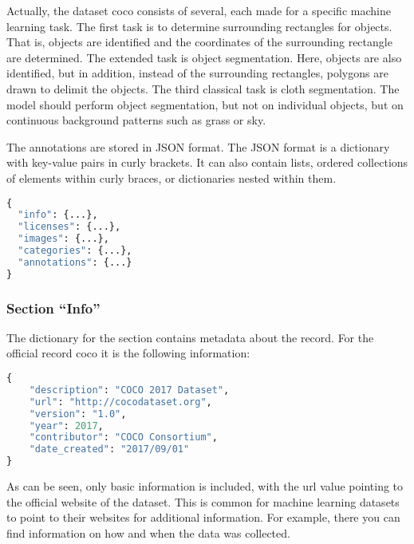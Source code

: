 Actually, the dataset \ac{coco} consists of several, each made for a specific machine learning task. The first task is to determine surrounding rectangles for objects. That is, objects are identified and the coordinates of the surrounding rectangle are determined. The extended task is object segmentation. Here, objects are also identified, but in addition, instead of the surrounding rectangles, polygons are drawn to delimit the objects. The third classical task is cloth segmentation. The model should perform object segmentation, but not on individual objects, but on continuous background patterns such as grass or sky.


\bigskip

The annotations are stored in JSON format. The JSON format is a dictionary with key-value pairs in curly brackets. It can also contain lists, ordered collections of elements within curly braces, or dictionaries nested within them.

\begin{code}
\begin{lstlisting}[language=python]
{
  "info": {...},
  "licenses": {...},
  "images": {...},
  "categories": {...},
  "annotations": {...}
}    
\end{lstlisting}
\caption{Information of the data set \ac{coco}}
\end{code}



\subsubsection{Section ``Info''}

The dictionary for the  section contains metadata about the record. For the official record \ac{coco} it is the following information:


\begin{code}
\begin{lstlisting}[language=python]
{
    "description": "COCO 2017 Dataset",
    "url": "http://cocodataset.org",
    "version": "1.0",
    "year": 2017,
    "contributor": "COCO Consortium",
    "date_created": "2017/09/01"
}
\end{lstlisting}
\caption{Metainformation of the dataset \ac{coco}}
\end{code}

As can be seen, only basic information is included, with the url value pointing to the official website of the dataset. This is common for machine learning datasets to point to their websites for additional information. For example, there you can find information on how and when the data was collected.

